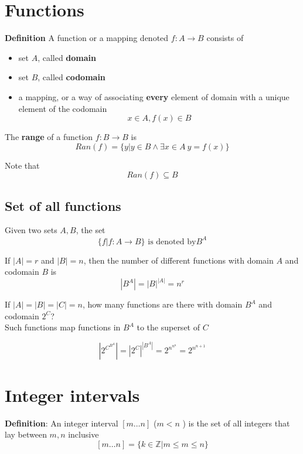 \section{Functions}

\begin{framed}
   \textbf{Definition} A function or a mapping denoted $f : A \rightarrow B$ consists of 
   \begin{itemize}
      \item set $A$, called \textbf{ domain}
      \item set $B$, called \textbf{ codomain}
      \item a mapping, or a way of associating \textbf{every} element of domain with a unique element of the codomain \[
        x \in A, f(x) \in B
      \] 
   \end{itemize}

   The \textbf{range} of a function $f:B \rightarrow B$ is
   \[
     Ran(f) = \{  y | y \in B \land \exists x \in A\ y = f(x) \} 
   \] 

   Note that
   \[
     Ran(f) \subseteq B
   \] 
\end{framed}

\subsection{Set of all functions}

Given two  sets  $A, B$, the set
\[
   \{ f | f: A \rightarrow B \} \text{ is denoted by} B^A
\] 

If $|A| = r$ and $|B| = n$, then the number of different functions with domain $A$ and codomain $B$ is
 \[
    |B^A| = |B|^{|A|} = n^r
\] 

If $|A| = |B| = |C| = n$, how many functions are there with domain  $B^A$ and codomain $2^C$? \\

Such functions map functions in $B^A$ to the superset of $C$

\[
   |2^{C^{B^A}}| = |2^C|^{|B^A|} = 2^{n^{n^n}} = 2^{n^{n+1}}
\] 


\section{Integer intervals}

\begin{framed}
   \textbf{Definition}: An integer interval $[m \hdots n]$ ($m < n$ ) is the set of all integers that lay between $m, n$ inclusive
   \[
      [m \hdots n] = \{  k \in \mathbb{Z} | m \leq m \leq n \} 
   \] 
\end{framed}

